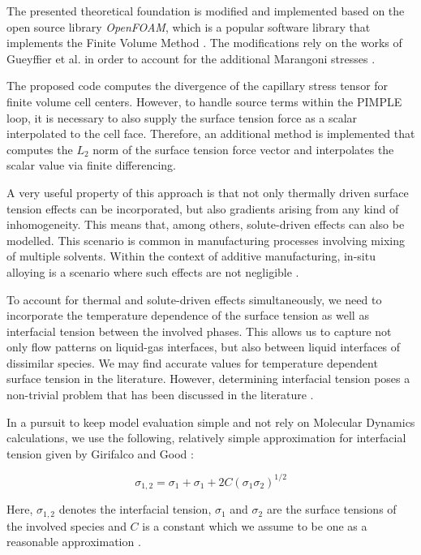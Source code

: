 \documentclass[conference,final,a4paper]{IEEEtran}
\begin{document}
The presented theoretical foundation is modified and implemented based on the open source library \textit{OpenFOAM}, which is a popular software library that implements the Finite Volume Method \cite{jasakOpenFOAMLibraryComplex2007}. The modifications rely on the works of Gueyffier et al. in order to account for the additional Marangoni stresses \cite{gueyffierVolumeofFluidInterfaceTracking1999}.

The proposed code computes the divergence of the capillary stress tensor for finite volume cell centers. However, to handle source terms within the PIMPLE loop, it is necessary to also supply the surface tension force as a scalar interpolated to the cell face. Therefore, an additional method is implemented that computes the $L_2$ norm of the surface tension force vector and interpolates the scalar value via finite differencing.

A very useful property of this approach is that not only thermally driven surface tension effects can be incorporated, but also gradients arising from any kind of inhomogeneity. This means that, among others, solute-driven effects can also be modelled. This scenario is common in manufacturing processes involving mixing of multiple solvents. Within the context of additive manufacturing, in-situ alloying is a scenario where such effects are not negligible \cite{katz-demyanetzInsituAlloyingNovel2020}.

To account for thermal and solute-driven effects simultaneously, we need to incorporate the temperature dependence of the surface tension as well as interfacial tension between the involved phases. This allows us to capture not only flow patterns on liquid-gas interfaces, but also between liquid interfaces of dissimilar species. We may find accurate values for temperature dependent surface tension in the literature. However, determining interfacial tension poses a non-trivial problem that has been discussed in the literature \cite{marmurCorrelatingInterfacialTensions2010}.

In a pursuit to keep model evaluation simple and not rely on Molecular Dynamics calculations, we use the following, relatively simple approximation for interfacial tension given by Girifalco and Good \cite{girifalcoTheoryEstimationSurface1957}:

\begin{equation}
    \sigma_{1,2} = \sigma_1 + \sigma_1 + 2C (\sigma_1 \sigma_2)^{1/2}
\end{equation}

Here, $\sigma_{1,2}$ denotes the interfacial tension, $\sigma_1$ and $\sigma_2$ are the surface tensions of the involved species and $C$ is a constant which we assume to be one as a reasonable approximation \cite{marmurCorrelatingInterfacialTensions2010}.
\end{document}
